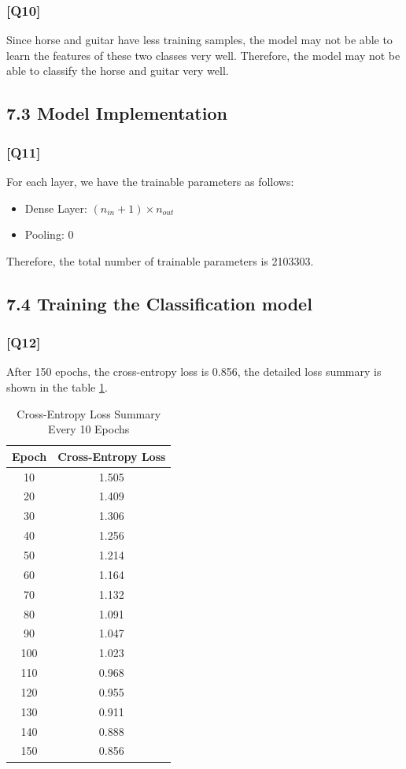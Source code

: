 \documentclass{article}
\begin{document}
\subsubsection*{[Q10]}
Since horse and guitar have less training samples, the model may not be able to learn the features of these two classes very well.
Therefore, the model may not be able to classify the horse and guitar very well.

\subsection*{7.3 Model Implementation}

\subsubsection*{[Q11]}

For each layer, we have the trainable parameters as follows:
\begin{itemize}
    \item Dense Layer: $(n_{in} + 1) \times n_{out}$
    \item Pooling: 0
\end{itemize}

Therefore, the total number of trainable parameters is 2103303.


\subsection*{7.4 Training the Classification model}

\subsubsection*{[Q12]}

After 150 epochs, the cross-entropy loss is 0.856, the detailed loss summary is shown in the table \ref{tab:cross_entropy_loss}.
\begin{table}[ht]
    \centering
    \caption{Cross-Entropy Loss Summary Every 10 Epochs}
    \begin{tabular}{cc}
    \toprule
    Epoch & Cross-Entropy Loss \\
    \midrule
    10  & 1.505 \\
    20  & 1.409 \\
    30  & 1.306 \\
    40  & 1.256 \\
    50  & 1.214 \\
    60  & 1.164 \\
    70  & 1.132 \\
    80  & 1.091 \\
    90  & 1.047 \\
    100 & 1.023 \\
    110 & 0.968 \\
    120 & 0.955 \\
    130 & 0.911 \\
    140 & 0.888 \\
    150 & 0.856 \\
    \bottomrule
    \end{tabular}
    \label{tab:cross_entropy_loss}
\end{table}
\end{document}

